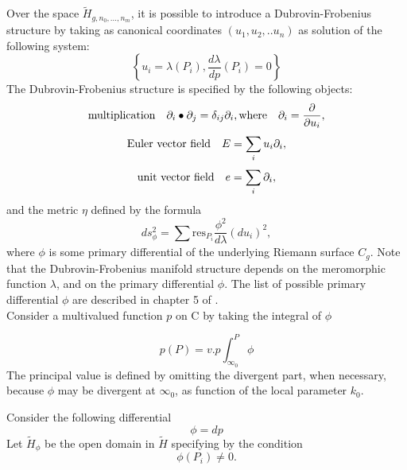 \documentclass{article}
\theoremstyle{definition}
\begin{document}
Over the space $\tilde H_{g,n_0 ,...,n_m}$, it is possible to introduce a Dubrovin-Frobenius structure by taking as canonical coordinates $(u_1,u_2,..u_n)$ as solution of the following system:
\begin{equation*}
\left\{u_i=\lambda(P_i), \frac{d\lambda}{dp}(P_i)=0\right\}
\end{equation*}
The Dubrovin-Frobenius structure is specified by the following objects:
\begin{equation}\label{Multiplication}
 \textnormal{multiplication}\quad  \partial_i\bullet\partial_j=\delta_{ij}\partial_i,\textnormal{where}\quad \partial_i=\frac{\partial}{\partial u_i},
\end{equation}
\begin{equation}\label{Euler vector field}
 \textnormal{Euler vector field}\quad E=\sum_i u_i\partial_i,
\end{equation}
\begin{equation}\label{Unit vector field}
 \textnormal{unit vector field}\quad e=\sum_i \partial_i,
\end{equation}
and the metric $\eta$ defined by the formula
\begin{equation}\label{metric}
ds^2_{\phi}=\sum \text{res}_{P_i}\frac{\phi^2}{d\lambda}(du_i)^2 ,
\end{equation}
where $\phi$ is some primary differential of the underlying Riemann surface $C_g$.
Note that the Dubrovin-Frobenius manifold structure depends on the meromorphic function $\lambda$, and on the primary differential $\phi$. The list of possible  primary differential $\phi$ are described  in chapter 5 of \cite{B. Dubrovin2}.\\


Consider a multivalued function $p$ on C by taking the integral of $\phi$

\begin{equation*}
p(P)=v.p\int_{\infty_0}^P \phi
\end{equation*}
The principal value is defined by omitting the divergent part, when necessary, because $\phi$ may be divergent at $\infty_0$, as function of the local parameter $k_0$. 

Consider the following differential 
\begin{equation*}
\phi=dp
\end{equation*}
Let $\tilde H_{\phi}$ be the open domain in $\tilde H$ specifying by the condition
\begin{equation*}
\phi(P_i)\neq 0.
\end{equation*}
\end{document}
